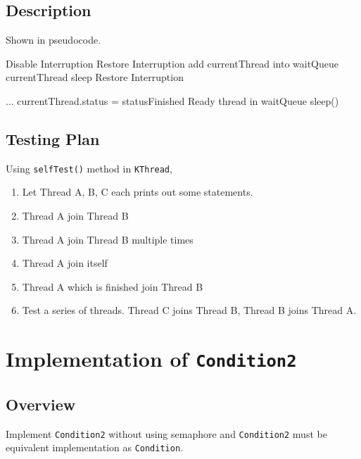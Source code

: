 \documentclass{article}
\begin{document}
\subsection{Description}
Shown in pseudocode.
\begin{algorithm}
  \begin{algorithmic}
			\State Disable Interruption
					\State Restore Interruption
					\State \Return
				\Else
					\State add currentThread into waitQueue
					\State currentThread sleep
				\EndIf
			\State Restore Interruption
		\EndProcedure
  \end{algorithmic}
	\begin{algorithmic}
			\State ...
			\State currentThread.status = statusFinished
			\State Ready thread in waitQueue
			\State sleep()
		\EndProcedure
  \end{algorithmic}
\end{algorithm}
\subsection{Testing Plan}
Using \texttt{selfTest()} method in \texttt{KThread},
\begin{enumerate}
	\item Let Thread A, B, C each prints out some statements.
	\item Thread A join Thread B
	\item Thread A join Thread B multiple times
	\item Thread A join itself
	\item Thread A which is finished join Thread B
	\item Test a series of threads. Thread C joins Thread B, Thread B joins Thread A.
\end{enumerate}
\section{Implementation of \texttt{Condition2}}
\subsection{Overview}
Implement \texttt{Condition2} without using semaphore and \texttt{Condition2} must be equivalent implementation as \texttt{Condition}.
\end{document}

